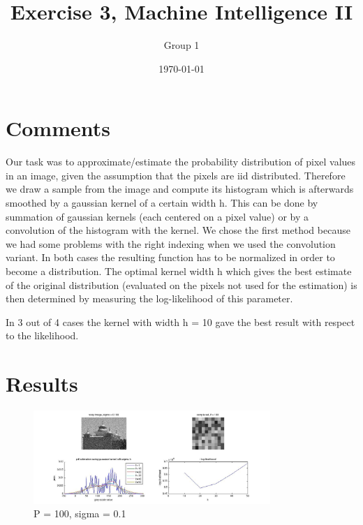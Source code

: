 \documentclass[]{article}
\title{Exercise 3, Machine Intelligence II}
\author{Group 1}
\date{\today}
\begin{document}
\ifpdf
{}
\else
{}
\fi

\maketitle

\section{Comments} %
\label{sg:sec:comments}

Our task was to approximate/estimate the probability distribution of pixel
values in an image, given the assumption that the pixels are iid distributed.
Therefore we draw a sample from the image and compute its histogram which is
afterwards smoothed by a gaussian kernel of a certain width h. This can be
done by summation of gaussian kernels (each centered on a pixel value) or
by a convolution of the histogram with the kernel. We chose the first method
because we had some problems with the right indexing when we used the convolution
variant. In both cases the resulting function has to be normalized in order
to become a distribution. The optimal kernel width h which gives the best
estimate of the original distribution (evaluated on the pixels not used for
the estimation) is then determined by measuring the log-likelihood of this parameter. 

In 3 out of 4 cases the kernel with width h = 10 gave the best result
with respect to the likelihood. 



\section{Results}

\begin{figure}[ht]
	\centering
		\includegraphics[width=0.8\textwidth]{plot100_01.jpg}
	\caption{P = 100, sigma = 0.1}
	\label{sg:fig:plot100_01}
\end{figure}
\end{document}
